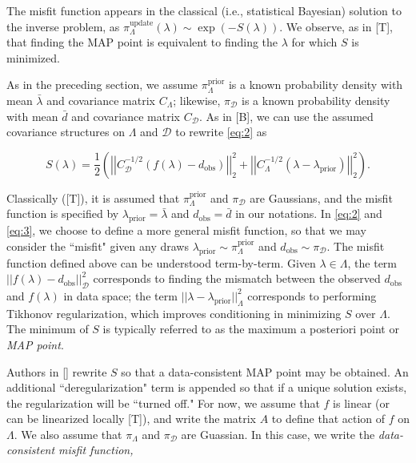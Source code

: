 \documentclass{amsart}
\begin{document}
The misfit function appears in the classical (i.e., statistical Bayesian) solution to the inverse problem, as $\pi_\Lambda^\text{update}(\lambda) \sim \exp(-S(\lambda)).$ We observe, as in [T], that finding the MAP point is equivalent to finding the $\lambda$ for which $S$ is minimized.

As in the preceding section, we assume $\pi_\Lambda^\text{prior}$ is a known probability density with mean $\bar{\lambda}$ and covariance matrix $C_\Lambda$; likewise, $\pi_\mathcal{D}$ is a known probability density with mean $\bar{d}$ and covariance matrix $C_\mathcal{D}$. As in [B], we can use the assumed covariance structures on $\Lambda$ and $\mathcal{D}$ to rewrite \eqref{eq:2} as


\begin{equation} \label{eq:3}
S(\lambda)=\frac{1}{2}\left(\left|\left|C_\mathcal{D}^{-1/2}(f(\lambda)-d_{\text{obs}})\right|\right|_2^2+\left|\left|C_\Lambda^{-1/2}(\lambda-\lambda_{\text{prior}})\right|\right|_2^2\right).
\end{equation} 

Classically ([T]), it is assumed that $\pi_\Lambda^\text{prior}$ and $\pi_\mathcal{D}$ are Gaussians, and the misfit function is specified by $\lambda_{\text{prior}}=\bar{\lambda}$ and $d_{\text{obs}}=\bar{d}$ in our notations. In \eqref{eq:2} and \eqref{eq:3}, we choose to define a more general misfit function, so that we may consider the ``misfit" given any draws $\lambda_{\text{prior}}\sim \pi_\Lambda^\text{prior}$ and $d_\text{obs} \sim \pi_\mathcal{D}$. The misfit function defined above can be understood term-by-term. Given $\lambda \in \Lambda$, the term $||f(\lambda)-d_{\text{obs}}||_\mathcal{D}^2$ corresponds to finding the mismatch between the observed $d_\text{obs}$ and $f(\lambda)$ in data space; the term $||\lambda-\lambda_{\text{prior}}||_\Lambda^2$ corresponds to performing Tikhonov regularization, which improves conditioning in minimizing $S$ over $\Lambda$. The minimum of $S$ is typically referred to as the maximum a posteriori point or \textit{MAP point}.

Authors in [] rewrite $S$ so that a data-consistent MAP point may be obtained. An additional ``deregularization" term is appended so that if a unique solution exists, the regularization will be ``turned off." For now, we assume that $f$ is linear (or can be linearized locally [T]), and write the matrix $A$ to define that action of $f$ on $\Lambda$. We also assume that $\pi_\Lambda$ and $\pi_\mathcal{D}$ are Guassian. In this case, we write the \textit{data-consistent misfit function,}
\end{document}
